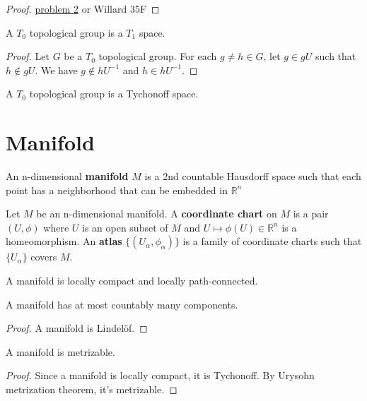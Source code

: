 \documentclass[12pt]{book}
\begin{document}
\begin{proof}
	\href{http://www.math.wm.edu/~vinroot/PadicGroups/519probset1.pdf}{problem 2} or Willard 35F
\end{proof}
\begin{theorem}
	A $T_0$ topological group is a $T_1$ space.
\end{theorem}
\begin{proof}
	Let $G$ be a $T_0$ topological group. For each $g\neq h\in G$, let $g\in gU$ such that $h\not\in gU$. We have $g\not\in hU^{-1}$ and $h\in hU^{-1}$.
\end{proof}
\begin{corollary}
	A $T_0$ topological group is a Tychonoff space.
\end{corollary}

\section{Manifold}

\begin{definition}
	An n-dimensional {\bf manifold} $M$ is a 2nd countable Hausdorff space such that each point has a neighborhood that can be embedded in $\mathbb R^n$
\end{definition}

\begin{definition}
	Let $M$ be an n-dimensional manifold. A {\bf coordinate chart} on $M$ is a pair $(U,\phi)$ where $U$ is an open subset of $M$ and $U\mapsto \phi(U)\in \mathbb R^n$ is a homeomorphism. An {\bf atlas} $\{(U_\alpha,\phi_\alpha)\}$ is a family of coordinate charts such that $\{U_\alpha\}$ covers $M$.
\end{definition}

\begin{lemma}
	A manifold is locally compact and locally path-connected.
\end{lemma}

\begin{lemma}
	A manifold has at most countably many components.
\end{lemma}
\begin{proof}
	A manifold is Lindel\"of.
\end{proof}

\begin{lemma}
	A manifold is metrizable.
\end{lemma}
\begin{proof}
	Since a manifold is locally compact, it is Tychonoff. By Urysohn metrization theorem, it's metrizable.
\end{proof}
\end{document}
